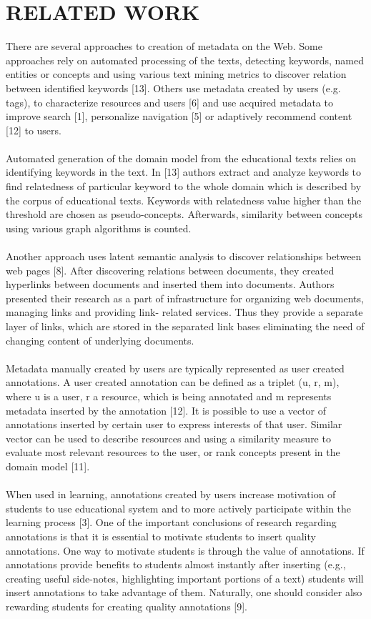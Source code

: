 \documentclass{llncs}
\begin{document}
\section{RELATED WORK}
%
There are several approaches to creation of metadata on the Web. Some approaches rely on automated processing of the texts, detecting keywords, named entities or concepts and using various text mining metrics to discover relation between identified keywords [13]. Others use metadata created by users (e.g. tags), to characterize resources and users [6] and use acquired metadata to improve search [1], personalize navigation [5] or adaptively recommend content [12] to users.\\
\\
Automated generation of the domain model from the educational texts relies on identifying keywords in the text. In [13] authors extract and analyze keywords to find relatedness of particular keyword to the whole domain which is described by the corpus of educational texts. Keywords with relatedness value higher than the threshold are chosen as pseudo-concepts. Afterwards, similarity between concepts using various graph algorithms is counted.\\
\\
Another approach uses latent semantic analysis to discover relationships between web pages [8]. After discovering relations between documents, they created hyperlinks between documents and inserted them into documents. Authors presented their research as a part of infrastructure for organizing web documents, managing links and providing link- related services. Thus they provide a separate layer of links, which are stored in the separated link bases eliminating the need of changing content of underlying documents.\\
\\
Metadata manually created by users are typically represented as user created annotations. A user created annotation can be defined as a triplet (u, r, m), where u is a user, r a resource, which is being annotated and m represents metadata inserted by the annotation [12]. It is possible to use a vector of annotations inserted by certain user to express interests of that user. Similar vector can be used to describe resources and using a similarity measure to evaluate most relevant resources to the user, or rank concepts present in the domain model [11].\\
\\
When used in learning, annotations created by users increase motivation of students to use educational system and to more actively participate within the learning process [3]. One of the important conclusions of research regarding annotations is that it is essential to motivate students to insert quality annotations. One way to motivate students is through the value of annotations. If annotations provide benefits to students almost instantly after inserting (e.g., creating useful side-notes, highlighting important portions of a text) students will insert annotations to take advantage of them. Naturally, one should consider also rewarding students for creating quality annotations [9].\\
\end{document}
